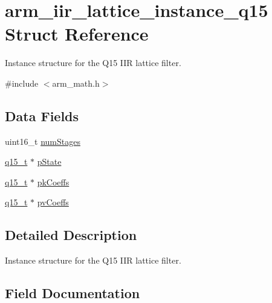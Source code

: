 \hypertarget{structarm__iir__lattice__instance__q15}{}\section{arm\+\_\+iir\+\_\+lattice\+\_\+instance\+\_\+q15 Struct Reference}
\label{structarm__iir__lattice__instance__q15}


Instance structure for the Q15 I\+IR lattice filter.  




{\ttfamily \#include $<$arm\+\_\+math.\+h$>$}

\subsection*{Data Fields}
\begin{DoxyCompactItemize}
\item 
uint16\+\_\+t \mbox{\hyperlink{structarm__iir__lattice__instance__q15_a4cceb90547b3e585d4c7aabaa8057212}{num\+Stages}}
\item 
\mbox{\hyperlink{arm__math_8h_ab5a8fb21a5b3b983d5f54f31614052ea}{q15\+\_\+t}} $\ast$ \mbox{\hyperlink{structarm__iir__lattice__instance__q15_ae29dfdb736374fcddaeaec4b7770170c}{p\+State}}
\item 
\mbox{\hyperlink{arm__math_8h_ab5a8fb21a5b3b983d5f54f31614052ea}{q15\+\_\+t}} $\ast$ \mbox{\hyperlink{structarm__iir__lattice__instance__q15_a12497c299b0341c18d497f8ab3465084}{pk\+Coeffs}}
\item 
\mbox{\hyperlink{arm__math_8h_ab5a8fb21a5b3b983d5f54f31614052ea}{q15\+\_\+t}} $\ast$ \mbox{\hyperlink{structarm__iir__lattice__instance__q15_a52866ed127c7b2a8a102e2ed1a2ebab8}{pv\+Coeffs}}
\end{DoxyCompactItemize}


\subsection{Detailed Description}
Instance structure for the Q15 I\+IR lattice filter. 

\subsection{Field Documentation}
\mbox{\label{structarm__iir__lattice__instance__q15_a4cceb90547b3e585d4c7aabaa8057212}} 
